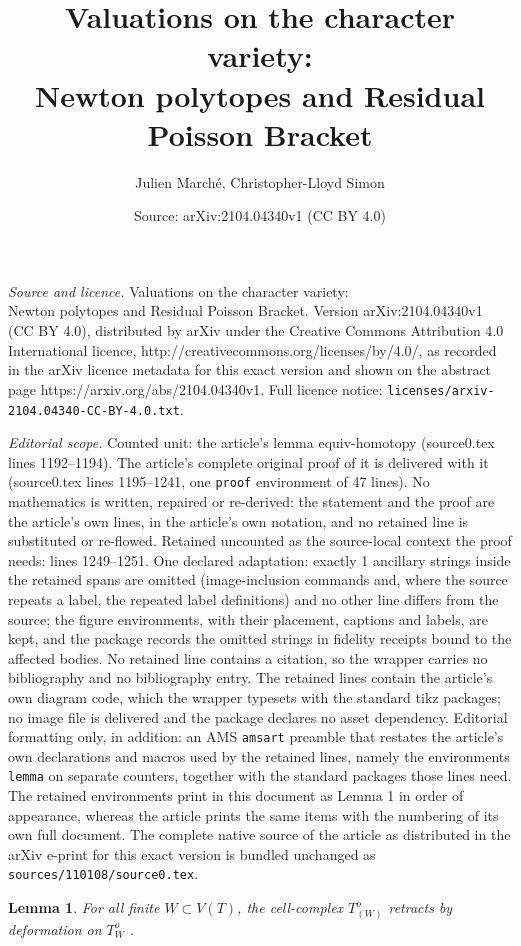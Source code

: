 \documentclass[10pt,a4paper]{amsart}
\title{Valuations on the character variety: \\ Newton polytopes and Residual Poisson Bracket}
\author{Julien March\'e, Christopher-Lloyd Simon}
\date{Source: arXiv:2104.04340v1 (CC BY 4.0)}
\newtheorem{lemma}{Lemma}
\begin{document}
\maketitle

\noindent\emph{Source and licence.} Valuations on the character variety: \\ Newton polytopes and Residual Poisson Bracket. Version arXiv:2104.04340v1 (CC BY 4.0), distributed by arXiv under the Creative Commons Attribution 4.0 International licence, http://creativecommons.org/licenses/by/4.0/, as recorded in the arXiv licence metadata for this exact version and shown on the abstract page https://arxiv.org/abs/2104.04340v1. Full licence notice: \texttt{licenses/arxiv-2104.04340-CC-BY-4.0.txt}.\par\smallskip

\noindent\textit{Editorial scope.} Counted unit: the article's lemma equiv-homotopy (source0.tex lines 1192--1194). The article's complete original proof of it is delivered with it (source0.tex lines 1195--1241, one \texttt{proof} environment of 47 lines). No mathematics is written, repaired or re-derived: the statement and the proof are the article's own lines, in the article's own notation, and no retained line is substituted or re-flowed.  Retained uncounted as the source-local context the proof needs: lines 1249--1251.  One declared adaptation: exactly 1 ancillary strings inside the retained spans are omitted (image-inclusion commands and, where the source repeats a label, the repeated label definitions) and no other line differs from the source; the figure environments, with their placement, captions and labels, are kept, and the package records the omitted strings in fidelity receipts bound to the affected bodies.  No retained line contains a citation, so the wrapper carries no bibliography and no bibliography entry.  The retained lines contain the article's own diagram code, which the wrapper typesets with the standard tikz packages; no image file is delivered and the package declares no asset dependency.  Editorial formatting only, in addition: an AMS \texttt{amsart} preamble that restates the article's own declarations and macros used by the retained lines, namely the environments \texttt{lemma} on separate counters, together with the standard packages those lines need.  The retained environments print in this document as Lemma 1 in order of appearance, whereas the article prints the same items with the numbering of its own full document.  The complete native source of the article as distributed in the arXiv e-print for this exact version is bundled unchanged as \texttt{sources/110108/source0.tex}.
\begin{lemma}\label{retraction}
For all finite $W\subset V(T)$, the cell-complex $T^o_{(W)}$ retracts by deformation on $T^o_W$ .
\end{lemma}
\end{document}
